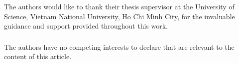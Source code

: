 \documentclass[runningheads]{llncs}
\begin{document}
\begin{credits}
\subsubsection{\ackname}
The authors would like to thank their thesis supervisor at the University of
Science, Vietnam National University, Ho Chi Minh City, for the invaluable
guidance and support provided throughout this work.%

\subsubsection{\discintname}
The authors have no competing interests to declare that are relevant to the
content of this article.
\end{credits}
%
%
%
% 
% 
%
\end{document}
